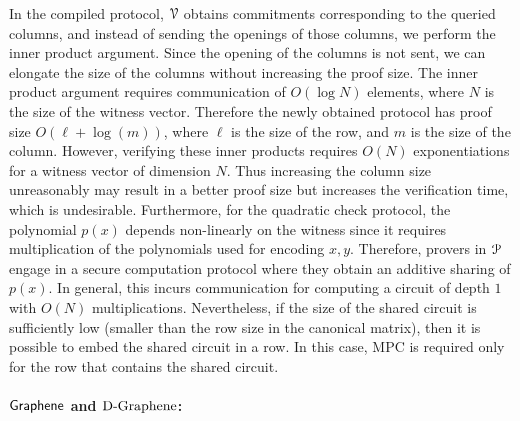 In the compiled protocol, $\mathcal{V}$ obtains commitments corresponding to the queried columns, and instead of sending the openings of those columns, we perform the inner product argument. Since the opening of the columns is not sent, we can elongate the size of the columns without increasing the proof size. The inner product argument requires communication of $O(\log N)$ elements, where $N$ is the size of the witness vector. Therefore the newly obtained protocol has proof size $O(\ell + \log (m))$, where $\ell$ is the size of the row, and $m$ is the size of the column. However, verifying these inner products requires $O(N)$ exponentiations for a witness vector of dimension $N$. Thus increasing the column size unreasonably may result in a better proof size but increases the verification time, which is undesirable.
Furthermore, for the quadratic check protocol, the polynomial $p(x)$ depends non-linearly on the witness since it requires multiplication of the polynomials used for encoding $x, y$. Therefore, provers in $\mathcal{P}$ engage in a secure computation protocol where they obtain an additive sharing of $p(x)$. In general, this incurs communication for computing a circuit of depth $1$ with $O(N)$ multiplications. Nevertheless, if the size of the shared circuit is sufficiently low (smaller than the row size in the canonical matrix), then it is possible to embed the shared circuit in a row. In this case, MPC is required only for the row that contains the shared circuit.

\paragraph*{$\textsf{Graphene}$ and $\text{D-Graphene}$:}

